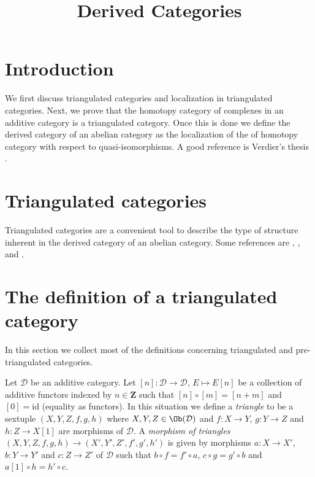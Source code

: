 

%


\title{Derived Categories}


\maketitle

\label{section-phantom}

\tableofcontents

\section{Introduction}
\label{section-introduction}

\noindent
We first discuss triangulated categories and localization in triangulated
categories. Next, we prove that the homotopy category of complexes in an
additive category is a triangulated category. Once this is done we define
the derived category of an abelian category as the localization of the
of homotopy category with respect to quasi-isomorphisms.
A good reference is Verdier's thesis \cite{Verdier}.



\section{Triangulated categories}
\label{section-triangulated-categories}

\noindent
Triangulated categories are a convenient tool to describe the type
of structure inherent in the derived category of an abelian category.
Some references are \cite{Verdier}, \cite{KS}, and \cite{Neeman}.




\section{The definition of a triangulated category}
\label{section-triangulated-definitions}

\noindent
In this section we collect most of the definitions concerning triangulated
and pre-triangulated categories.

\begin{definition}
\label{definition-triangle}
Let $\mathcal{D}$ be an additive category.
Let $[n] : \mathcal{D} \to \mathcal{D}$, $E \mapsto E[n]$
be a collection of additive functors indexed by $n \in \mathbf{Z}$ such that
$[n] \circ [m] = [n + m]$  and $[0] = \text{id}$ (equality as functors).
In this situation we define a {\it triangle} to be a sextuple
$(X, Y, Z, f, g, h)$ where $X, Y, Z \in \Ob(\mathcal{D})$ and
$f : X \to Y$, $g : Y \to Z$ and $h : Z \to X[1]$ are morphisms
of $\mathcal{D}$.
A {\it morphism of triangles}
$(X, Y, Z, f, g, h) \to (X', Y', Z', f', g', h')$
is given by morphisms $a : X \to X'$, $b : Y \to Y'$ and $c : Z \to Z'$
of $\mathcal{D}$ such that
$b \circ f = f' \circ a$, $c  \circ g = g' \circ b$ and
$a[1] \circ h = h' \circ c$.
\end{definition}

